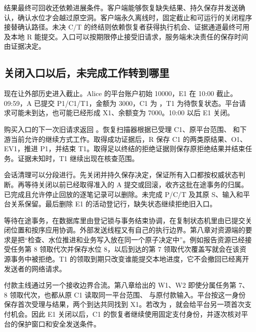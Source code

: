 结果最终可回收还依赖进展条件。客户端能够恢复缺失结果、持久保存并发送确认，确认水位才会越过原空洞。客户端永久离线时，固定截止和可运行的关闭程序接替确认路径。未决 C/T 的终结则依赖恢复者获得执行机会、证据通道最终可用及本地 R 能提交。入口可以按期限停止接受旧请求，服务端未决责任的保存时间由证据决定。

\subsection*{关闭入口以后，未完成工作转到哪里}

现在让外部历史进入截止。Alice 的平台账户初始 10000，E1 在 10:00 截止。09:59，A 已提交 P1/C1/T1，金额为 3000，C1 为 ，T1 为待恢复状态。平台请求可能未到达，也可能已经形成 X1、余额变为 7000。10:00 以后 E1 关闭。

购买入口的下一次旧请求返回 。恢复扫描器根据已受理 C1、原平台范围、 和下游当前允许的继续方式工作。取得成功证据后，R 保存 C1 的两类原结果、O1、EV1，推进 P1，并结束 T1。取得足以终结的拒绝证据则保存原拒绝结果并结束任务。证据未知时，T1 继续出现在核查范围。


会话清理可以分段进行。先关闭并持久保存决定，保证所有入口都按权威状态判断。再等待关闭以前已经取得准入的 A 提交或回滚，收齐这批在途事务的归属。已完成且允许停止回放的逐笔记录可以删除。未完成 P/C/T 及其原 S、输入和平台关系保留。最后删除 E1 的活动登记行，缺失状态继续拒绝旧入口。

等待在途事务，在数据库里由登记锁与事务结束协调，在复制状态机里由已提交关闭位置和按序应用协调。外部发送线程又有自己的执行边界。第八章对资源端的要求是把“检查、水位推进和业务写入放在同一个原子决定中”。例如报告资源已经接受任务第 8 领取代次并保存水位 8，以后到达的第 7 领取代次覆盖写就会在该资源事务中被拒绝。T1 的领取到期只改变谁能提交本地进度，它不会撤回已经离开发送者的网络请求。

付款主线通过另一个接收边界合流。第八章给出的 W1、W2 即使分属任务第 7、8 领取代次，也都从原 C1 读取同一平台范围、 与原付款输入。平台按这一身份保存首次受理与结果，两个到达共同找到 X1。若改为 ，就会给平台另一项首次支付机会。因此 E1 关闭以后，C1 的恢复者继续使用固定支付身份，并逐次核对平台的保护窗口和安全发送条件。


